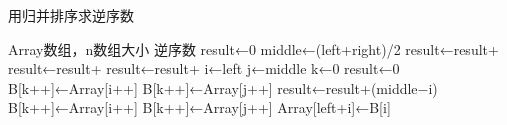 \documentclass[11pt]{ctexart}
\begin{document}
  
	\begin{algorithm}  
		\caption{用归并排序求逆序数}  
		\begin{algorithmic}[1] %
			\Require Array数组，n数组大小  
			\Ensure 逆序数  
			\State result←0  
			\State middle←(left+right)/2  
			\State result←result+   
			\State result←result+   
			\State result←result+   
			\EndIf  
			\State {}  
			\EndFunction  
			\State  
			\State i←left  
			\State j←middle  
			\State k←0  
			\State result←0  
			\State B[k++]←Array[i++]  
			\Else  
			\State B[k++]←Array[j++]  
			\State result←result+(middle−i)  
			\EndIf  
			\EndWhile  
			\State B[k++]←Array[i++]  
			\EndWhile  
			\State B[k++]←Array[j++]  
			\EndWhile  
			\State Array[left+i]←B[i]  
			\EndFor  
			\State {}  
			\EndFunction  
		\end{algorithmic}  
	\end{algorithm}  
\end{document}

